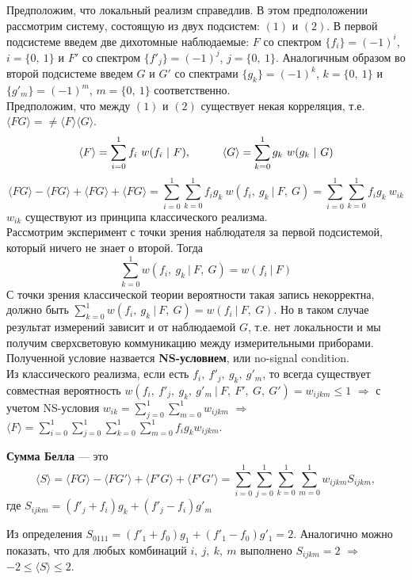 Предположим, что локальный реализм справедлив. В этом предположении рассмотрим систему, состоящую из двух подсистем: $(1)$ и $(2)$. В первой подсистеме введем две дихотомные наблюдаемые: $F$ со спектром $\{f_i\} = (-1)^i$, $i=\{0,~1\}$ и $F'$ со спектром $\{f'_j\} = (-1)^j$, $j=\{0,~1\}$. Аналогичным образом во второй подсистеме введем $G$ и $G'$ со спектрами $\{g_k\}=(-1)^k$, $k=\{0,~1\}$ и $\{g'_m\}=(-1)^m$, $m=\{0,~1\}$ соответственно.\\

Предположим, что между $(1)$ и $(2)$ существует некая корреляция, т.е. $\langle FG \rangle =  \neq \langle F \rangle \langle G \rangle$.
\[
\langle F \rangle = \sum\limits_{i=0}^1 f_i~w(f_i~|~F), \hspace*{1cm} 
\langle G \rangle = \sum\limits_{k=0}^1 g_k~w(g_k~|~G)
\]
\[
\langle FG \rangle - \langle FG \rangle + \langle FG \rangle + \langle FG \rangle = \sum\limits_{i=0}^1 \sum\limits_{k=0}^1 f_i g_k~w(f_i,~g_k~|~F,~G) = \sum\limits_{i=0}^1 \sum\limits_{k=0}^1 f_i g_k~w_{ik}
\]
$w_{ik}$ существуют из принципа классического реализма.\\

Рассмотрим эксперимент с точки зрения наблюдателя за первой подсистемой, который ничего не знает о второй. Тогда
\[
\sum\limits_{k=0}^1 w(f_i,~g_k~|~F,~G) = w(f_i~|~F)
\]
С точки зрения классической теории вероятности такая запись некорректна, должно быть $\sum\limits_{k=0}^1 w(f_i,~g_k~|~F,~G) = w(f_i~|~F,~G)$. Но в таком случае результат измерений зависит и от наблюдаемой $G$, т.е. нет локальности и мы получим сверхсветовую коммуникацию между измерительными приборами. Полученной условие назвается \textbf{NS-условием}, или no-signal condition.\\

Из классического реализма, если есть $f_i,~f'_j,~g_k,~g'_m$, то всегда существует совместная вероятность $w(f_i,~f'_j,~g_k,~g'_m~|~F,~F',~G,~G') = w_{ijkm}\leq 1$ $\Longrightarrow$ с учетом NS-условия $w_{ik} = \sum\limits_{j=0}^1\sum\limits_{m=0}^1 w_{ijkm}$ $\Longrightarrow$ $\langle F\rangle = \sum\limits_{i=0}^1\sum\limits_{j=0}^1\sum\limits_{k=0}^1\sum\limits_{m=0}^1 f_ig_kw_{ijkm}$.\\

\begin{definition}
	\textbf{Сумма Белла} --- это
	\[
	\langle S \rangle = \langle FG \rangle - \langle FG' \rangle + \langle F'G \rangle + \langle F'G' \rangle = \sum\limits_{i=0}^1\sum\limits_{j=0}^1\sum\limits_{k=0}^1\sum\limits_{m=0}^1w_{ijkm}S_{ijkm},
	\]
	где $S_{ijkm} = (f'_j + f_i)g_k + (f'_j - f_i)g'_m$
\end{definition}
Из определения $S_{0111} = (f'_1 + f_0)g_1 + (f'_1 - f_0)g'_1 = 2$. Аналогично можно показать, что для любых комбинаций $i,~j,~k,~m$ выполнено $S_{ijkm} = 2$ $\Longrightarrow$ $-2 \leq \langle S \rangle \leq 2$.\\

